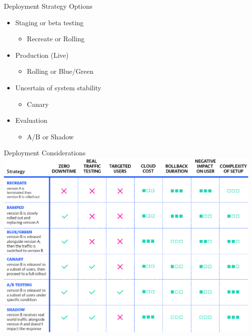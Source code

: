 \documentclass{slide}
\begin{document}
\begin{frame}{Deployment Strategy Options}
  \vspace{1pt}
  {\huge
    \begin{itemize}
        \item Staging or beta testing
        \begin{itemize}
            \LARGE\item Recreate or Rolling
        \end{itemize}
        \vspace{1mm}
        \item Production (Live)
        \begin{itemize}
            \LARGE\item Rolling or Blue/Green
        \end{itemize}
        \vspace{1mm}
        \item Uncertain of system stability
        \begin{itemize}
            \LARGE\item Canary
        \end{itemize}
        \vspace{1mm}
        \item Evaluation
        \begin{itemize}
            \LARGE\item A/B or Shadow
        \end{itemize}
    \end{itemize}
  }
\end{frame}

\begin{frame}{Deployment Considerations \cite{deployment-strategies}}
    \centering
    \includegraphics[height=0.93\textheight]{diagrams/deployment_strategies.png}
\end{frame}
\end{document}
